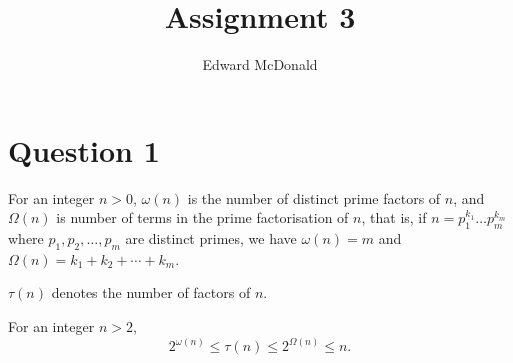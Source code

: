 \documentclass{unswmaths}
\begin{document}
\subject{Number Theory}
\author{Edward McDonald}
\title{Assignment 3}


\setlength\parindent{0pt}

\unswtitle{}

\section*{Question 1}

\begin{definition}
    For an integer $n > 0$, $\omega(n)$ is the number of distinct prime factors of $n$, and $\Omega(n)$
    is number of terms in the prime factorisation of $n$, that is, if $n = p_1^{k_1}\ldots p_m^{k_m}$
    where $p_1,p_2,\ldots,p_m$ are distinct primes, we have $\omega(n) = m$ and $\Omega(n) = k_1+k_2+\cdots+k_m$.
    
    $\tau(n)$ denotes the number of factors of $n$.
\end{definition}
\begin{lemma}
    For an integer $n > 2$,
    \begin{equation*}
        2^{\omega(n)}\leq \tau(n) \leq 2^{\Omega(n)}\leq n.
    \end{equation*}
\end{lemma}
\end{document}
